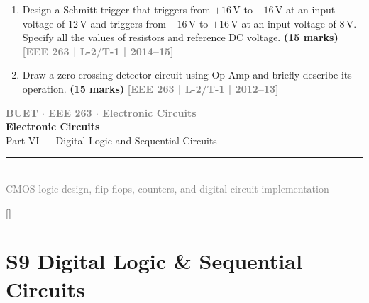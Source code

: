 \documentclass[12pt]{article}
\newcommand{\yr}[1]{\hfill\textcolor{gray}{\small\textbf{[#1]}}}
\newcommand{\mk}[1]{\textcolor{orange!70!black}{\small\textbf{(#1 marks)}}}
\newcommand{\secdivider}[3]{%
  \newpage\thispagestyle{empty}%
  \vspace*{\fill}%
  \begin{tcolorbox}[enhanced,colback=#3!6,colframe=#3,boxrule=1.5pt,arc=8pt,
    left=20pt,right=20pt,top=22pt,bottom=22pt,
    shadow={3pt}{-3pt}{0pt}{black!15}]
    \centering
    {\large\textcolor{gray}{\textbf{BUET $\cdot$ EEE 263 $\cdot$ Electronic Circuits}}}\\[8pt]
    {\fontsize{26}{32}\selectfont\bfseries\textcolor{#3}{Electronic Circuits}}\\[6pt]
    {\fontsize{15}{19}\selectfont\textcolor{dgray}{#1}}\\[12pt]
    \textcolor{#3!60}{\rule{0.5\textwidth}{0.5pt}}\\[6pt]
    {\small\textcolor{gray}{#2}}
  \end{tcolorbox}%
  \vspace*{\fill}\newpage%
}
\begin{document}
\begin{enumerate}
\begin{center}
\end{center}
\mk{11} \yr{EEE 263 | L-2/T-1 | 2016--17}


\item Design a Schmitt trigger that triggers from $+16\,\text{V}$ to $-16\,\text{V}$ at an input voltage of 12\,V and triggers from $-16\,\text{V}$ to $+16\,\text{V}$ at an input voltage of 8\,V. Specify all the values of resistors and reference DC voltage.
\mk{15} \yr{EEE 263 | L-2/T-1 | 2014--15}


\item Draw a zero-crossing detector circuit using Op-Amp and briefly describe its operation.
\mk{15} \yr{EEE 263 | L-2/T-1 | 2012--13}


\end{enumerate}

\secdivider{Part VI --- Digital Logic and Sequential Circuits}{CMOS logic design, flip-flops, counters, and digital circuit implementation}{cD}

\titleformat{\section}{\large\bfseries\color{cD}}{}{0em}{}[\titlerule]

\section{S9 \quad Digital Logic \& Sequential Circuits}
\label{sec:S9}
\end{document}
